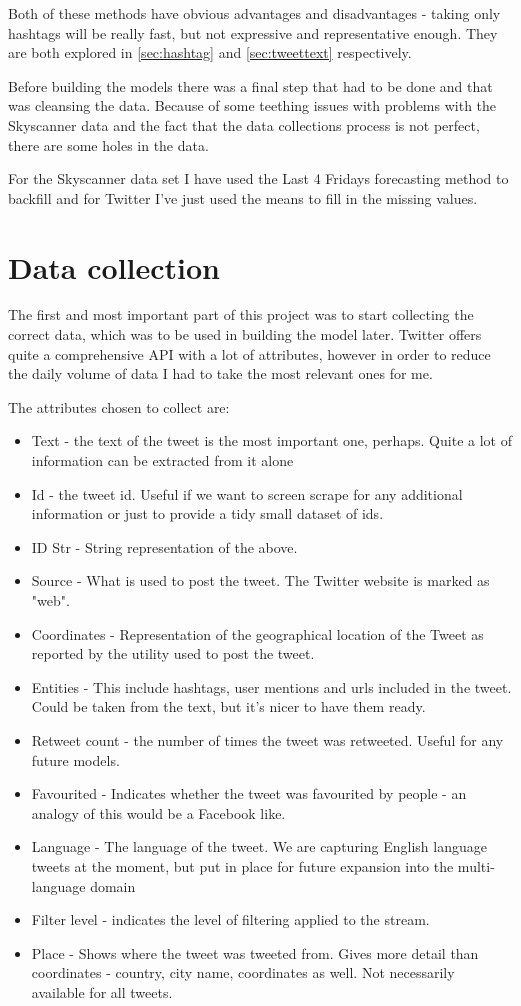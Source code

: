 \documentclass[minf,frontabs,twoside,singlespacing,parskip]{infthesis}
\begin{document}
Both of these methods have obvious advantages and disadvantages - taking only hashtags will be really fast, but not expressive and representative enough. They are both explored in  \ref{sec:hashtag} and \ref{sec:tweettext} respectively. 


Before building the models there was a final step that had to be done and that was cleansing the data. Because of some teething issues with problems with the Skyscanner data and the fact that the data collections process is not perfect, there are some holes in the data. 


For the Skyscanner data set I have used the Last 4 Fridays forecasting method to backfill and for Twitter I've just used the means to fill in the missing values. 

\section{Data collection}
\label{sec:dc}

The first and most important part of this project was to start collecting the correct data, which was to be used in building the model later. Twitter offers quite a comprehensive API with a lot of attributes, however in order to reduce the daily volume of data I had to take the most relevant ones for me. 

The attributes chosen to collect are:
\begin{itemize}
\item Text - the text of the tweet is the most important one, perhaps. Quite a lot of information can be extracted from it alone
\item Id - the tweet id. Useful if we want to screen scrape for any additional information or just to provide a tidy small dataset of ids.
\item ID Str - String representation of the above.
\item Source - What is used to post the tweet. The Twitter website is marked as "web".
\item Coordinates  - Representation of the geographical location of the Tweet as reported by the utility used to post the tweet.
\item Entities - This include hashtags, user mentions and urls included in the tweet. Could be taken from the text, but it's nicer to have them ready.
\item Retweet count - the number of times the tweet was retweeted. Useful for any future models. 
\item Favourited - Indicates whether the tweet was favourited by people - an analogy of this would be a Facebook like. 
\item Language - The language of the tweet. We are capturing English language tweets at the moment, but put in place for future expansion into the multi-language domain
\item Filter level - indicates the level of filtering applied to the stream.
\item Place - Shows where the tweet was tweeted from. Gives more detail than coordinates - country, city name, coordinates as well. Not necessarily available for all tweets.
\end{itemize}
\end{document}
